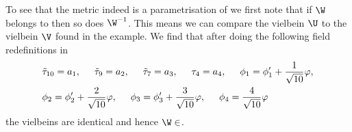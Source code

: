 To see that the metric indeed is a parametrisation of  we first note that if $\W$ belongs to  then so does $\W^{-1}$. This means we can compare the vielbein $\U$ to the vielbein $\V$  found in the  example.
We find that after doing the following field redefinitions in 
\begin{align}
&\tilde\tau_{10}=a_1,\hspace{.5cm}\tilde\tau_9=a_2,\hspace{.5cm}\tilde\tau_7=a_3,\hspace{.5cm}\tau_4=a_4,\hspace{.5cm}\phi_1=\phi_1'+\frac{1}{\sqrt{10}}\varphi,\nonumber\\
&\phi_2=\phi_2'+\frac{2}{\sqrt{10}}\varphi,\hspace{.5cm}\phi_3=\phi_3'+\frac{3}{\sqrt{10}}\varphi,\hspace{.5cm}\phi_4=\frac{4}{\sqrt{1%
0}}\varphi
\end{align}
the vielbeins are identical and hence $\W\in$.

